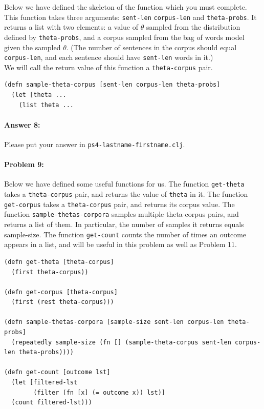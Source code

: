 \documentclass[10pt]{article}
\newcommand{\required}[1]{{\color{blue}{#1}}}
\newcommand{\PSnum}{4}
\begin{document}
Below we have defined the skeleton of the function
\required{\texttt{sample-theta-corpus}} which you must complete.  This
function takes three arguments: \texttt{sent-len} \texttt{corpus-len}
and \texttt{theta-probs}. It returns a list with two elements: a value
of $\theta$ sampled from the distribution defined by
\texttt{theta-probs}, and a corpus sampled from the bag of words model
given the sampled $\theta$. (The number of sentences in the corpus
should equal \texttt{corpus-len}, and each sentence should have
\texttt{sent-len} words in it.) \\

 We will call the return value of this function a \texttt{theta-corpus} pair.

\begin{lstlisting}
(defn sample-theta-corpus [sent-len corpus-len theta-probs]
  (let [theta ...
    (list theta ...
\end{lstlisting}

\paragraph{Answer 8:} Please put your answer in
\texttt{ps\PSnum-lastname-firstname.clj}.

\hrulefill %

\paragraph{Problem 9:}

Below we have defined some useful functions for us. The function
\texttt{get-theta} takes a \texttt{theta-corpus} pair, and returns the
value of \texttt{theta} in it. The function \texttt{get-corpus} takes
a \texttt{theta-corpus} pair, and returns its corpus value. The
function \texttt{sample-thetas-corpora} samples multiple theta-corpus
pairs, and returns a list of them. In particular, the number of
samples it returns equals sample-size.  The function \texttt{get-count}
counts the number of times an outcome appears in a list, and will be
useful in this problem as well as Problem 11.

\begin{lstlisting}
(defn get-theta [theta-corpus]
  (first theta-corpus))

(defn get-corpus [theta-corpus]
  (first (rest theta-corpus)))
  
(defn sample-thetas-corpora [sample-size sent-len corpus-len theta-probs]
  (repeatedly sample-size (fn [] (sample-theta-corpus sent-len corpus-len theta-probs))))

(defn get-count [outcome lst]
  (let [filtered-lst 
        (filter (fn [x] (= outcome x)) lst)]
  (count filtered-lst)))
\end{lstlisting}
\end{document}

